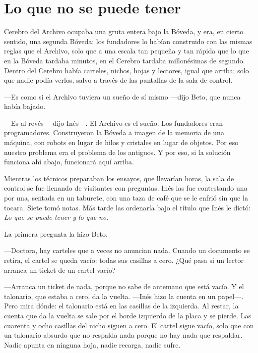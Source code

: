 \chapter{Lo que no se puede tener}

 Cerebro del Archivo ocupaba una gruta entera bajo la Bóveda, y era, en cierto sentido, una segunda Bóveda: los fundadores lo habían construido con las mismas reglas que el Archivo, solo que a una escala tan pequeña y tan rápida que lo que en la Bóveda tardaba minutos, en el Cerebro tardaba millonésimas de segundo. Dentro del Cerebro había carteles, nichos, hojas y lectores, igual que arriba; solo que nadie podía verlos, salvo a través de las pantallas de la sala de control.

---Es como si el Archivo tuviera un sueño de sí mismo ---dijo Beto, que nunca había bajado.

---Es al revés ---dijo Inés---\nobreak. El Archivo es el sueño. Los fundadores eran programadores. Construyeron la Bóveda a imagen de la memoria de una máquina, con robots en lugar de hilos y cristales en lugar de objetos. Por eso nuestro problema era el problema de los antiguos. Y por eso, si la solución funciona ahí abajo, funcionará aquí arriba.

Mientras los técnicos preparaban los ensayos, que llevarían horas, la sala de control se fue llenando de visitantes con preguntas. Inés las fue contestando una por una, sentada en un taburete, con una taza de café que se le enfrió sin que la tocara. Siete tomó notas. Más tarde las ordenaría bajo el título que Inés le dictó: \emph{Lo que se puede tener y lo que no}.

\escena
La primera pregunta la hizo Beto.

---Doctora, hay carteles que a veces no anuncian nada. Cuando un documento se retira, el cartel se queda vacío: todas sus casillas a cero. ¿Qué pasa si un lector arranca un ticket de un cartel vacío?

---Arranca un ticket de nada, porque no sabe de antemano que está vacío. Y el talonario, que estaba a cero, da la vuelta. ---Inés hizo la cuenta en un papel---\nobreak. Pero mira dónde: el talonario está en las casillas de la izquierda. Al restar, la cuenta que da la vuelta se sale por el borde izquierdo de la placa y se pierde. Las cuarenta y ocho casillas del nicho siguen a cero. El cartel sigue vacío, solo que con un talonario absurdo que no respalda nada porque no hay nada que respaldar. Nadie apunta en ninguna hoja, nadie recarga, nadie sufre.


